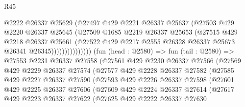 \begin{lexlean}{R45}
\begin{coremodule}
                            @2222
                            @26337
                            @25629
                            (@27497
                              @429
                              @2221
                              @26337
                              @25637
                              (@27503
                                @429
                                @2220
                                @26337
                                @25645
                                (@27509
                                  @1685
                                  @2219
                                  @26337
                                  @25653
                                  (@27515
                                    @429
                                    @2218
                                    @26337
                                    @25661
                                    (@27522
                                      @429
                                      @2217
                                      @2555
                                      @26328
                                      @26337
                                      @25673
                                      @26341
                                      @26345)))))))))))))))
        (fun (head : @2580) =>
        fun (tail : @2580) =>
        @27553
          @2231
          @26337
          @27558
          (@27561
            @429
            @2230
            @26337
            @27566
            (@27569
              @429
              @2229
              @26337
              @27574
              (@27577
                @429
                @2228
                @26337
                @27582
                (@27585
                  @429
                  @2227
                  @26337
                  @27590
                  (@27593
                    @429
                    @2226
                    @26337
                    @27598
                    (@27601
                      @429
                      @2225
                      @26337
                      @27606
                      (@27609
                        @429
                        @2224
                        @26337
                        @27614
                        (@27617
                          @429
                          @2223
                          @26337
                          @27622
                          (@27625
                            @429
                            @2222
                            @26337
                            @27630

\end{coremodule}
\end{lexlean}
